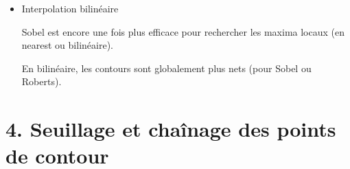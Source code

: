 \documentclass{article}
\begin{document}
\begin{itemize}
	\item Interpolation bilinéaire

\begin{center}
	
\end{center}

Sobel est encore une fois plus efficace pour rechercher les maxima locaux (en nearest ou bilinéaire).

En bilinéaire, les contours sont globalement plus nets (pour Sobel ou Roberts).		

\end{itemize}

\section*{4. Seuillage et chaînage des points de contour}
\end{document}
